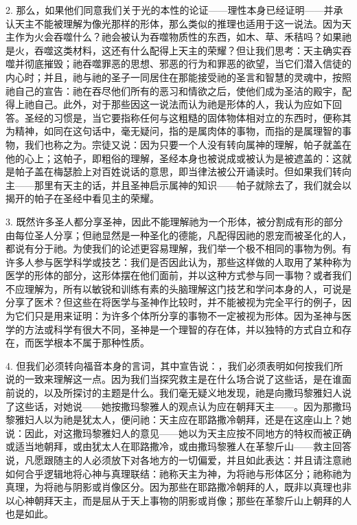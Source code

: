 2. 那么，如果他们同意我们关于光的本性的论证——理性本身已经证明——并承认天主不能被理解为像光那样的形体，那么类似的推理也适用于这一说法。因为天主作为火会吞噬什么？祂会被认为吞噬物质性的东西，如木、草、禾秸吗？如果祂是火，吞噬这类材料，这还有什么配得上天主的荣耀？但让我们思考：天主确实吞噬并彻底摧毁；祂吞噬罪恶的思想、邪恶的行为和罪恶的欲望，当它们潜入信徒的内心时；并且，祂与祂的圣子一同居住在那能接受祂的圣言和智慧的灵魂中，按照祂自己的宣告：祂在吞尽他们所有的恶习和情欲之后，使他们成为圣洁的殿宇，配得上祂自己。此外，对于那些因这一说法而认为祂是形体的人，我认为应如下回答。圣经的习惯是，当它要指称任何与这粗糙的固体物体相对立的东西时，便称其为精神，如同在这句话中，毫无疑问，指的是属肉体的事物，而指的是属理智的事物，我们也称之为。宗徒又说：因为只要一个人没有转向属神的理解，帕子就盖在他的心上；这帕子，即粗俗的理解，圣经本身也被说成或被认为是被遮盖的：这就是帕子盖在梅瑟脸上对百姓说话的意思，即当律法被公开诵读时。但如果我们转向主——那里有天主的话，并且圣神启示属神的知识——帕子就除去了，我们就会以揭开的帕子在圣经中看见主的荣耀。\par

3. 既然许多圣人都分享圣神，因此不能理解祂为一个形体，被分割成有形的部分由每位圣人分享；但祂显然是一种圣化的德能，凡配得因祂的恩宠而被圣化的人，都说有分于祂。为使我们的论述更容易理解，我们举一个极不相同的事物为例。有许多人参与医学科学或技艺：我们是否因此认为，那些这样做的人取用了某种称为医学的形体的部分，这形体摆在他们面前，并以这种方式参与同一事物？或者我们不应理解为，所有以敏锐和训练有素的头脑理解这门技艺和学问本身的人，可说是分享了医术？但这些在将医学与圣神作比较时，并不能被视为完全平行的例子，因为它们只是用来证明：为许多个体所分享的事物不一定被视为形体。因为圣神与医学的方法或科学有很大不同，圣神是一个理智的存在体，并以独特的方式自立和存在，而医学根本不属于那种性质。\par

4. 但我们必须转向福音本身的言词，其中宣告说：，我们必须表明如何按我们所说的一致来理解这一点。因为我们当探究救主是在什么场合说了这些话，是在谁面前说的，以及所探讨的主题是什么。我们毫无疑义地发现，祂是向撒玛黎雅妇人说了这些话，对她说——她按撒玛黎雅人的观点认为应在朝拜天主——。因为那撒玛黎雅妇人以为祂是犹太人，便问祂：天主应在耶路撒冷朝拜，还是在这座山上？她说：因此，对这撒玛黎雅妇人的意见——她以为天主应按不同地方的特权而被正确或适当地朝拜，或由犹太人在耶路撒冷，或由撒玛黎雅人在革黎斤山——救主回答说，凡愿跟随主的人必须放下对各地方的一切偏爱，并且如此表达：并且请注意祂如何合乎逻辑地将心神与真理联结：祂称天主为神，为将祂与形体区分；祂称祂为真理，为将祂与阴影或肖像区分。因为那些在耶路撒冷朝拜的人，既非以真理也非以心神朝拜天主，而是屈从于天上事物的阴影或肖像；那些在革黎斤山上朝拜的人也是如此。\par

